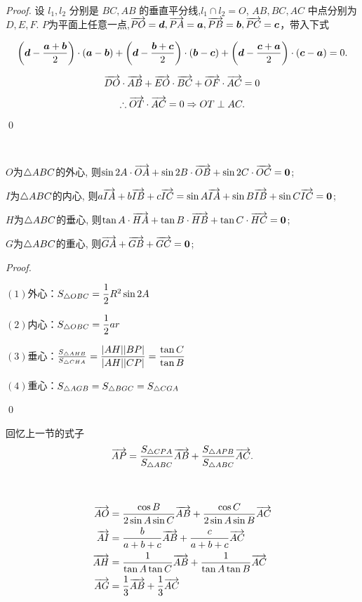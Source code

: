 \begin{proof}
    设 $l_1, l_2$ 分别是 $BC, AB$ 的垂直平分线,\(l_1\cap l_2=O\), $AB, BC, AC$ 中点分别为 $D, E, F$.
    \(P\)为平面上任意一点,\(\overrightarrow{PO}=\boldsymbol{d}, \overrightarrow{PA}=\boldsymbol{a},\overrightarrow{PB}=\boldsymbol{b},\overrightarrow{PC}=\boldsymbol{c}\)，带入下式

    \[
\left(\boldsymbol{d} - \frac{\boldsymbol{a}+\boldsymbol{b}}{2}\right) \cdot (\boldsymbol{a}-\boldsymbol{b}) + \left(\boldsymbol{d}-\frac{\boldsymbol{b}+\boldsymbol{c}}{2}\right) \cdot (\boldsymbol{b}-\boldsymbol{c}) + \left(
    \boldsymbol{d} - \frac{\boldsymbol{c}+\boldsymbol{a}}{2}\right) \cdot (\boldsymbol{c}-\boldsymbol{a}) = 0.
\]

\[
\overrightarrow{DO} \cdot \overrightarrow{AB} + \overrightarrow{EO} \cdot \overrightarrow{BC} + \overrightarrow{OF} \cdot \overrightarrow{AC} = 0
\]
\[
\therefore \overrightarrow{OT} \cdot \overrightarrow{AC} = 0 \Rightarrow  OT \perp AC.
\]
\qed
\end{proof}

\begin{corollary}
    \ 

    \(O\)为\(\triangle ABC\)的外心, 则\(\sin 2A \cdot\overrightarrow{OA}+\sin 2B\cdot\overrightarrow{OB}+\sin 2C\cdot\overrightarrow{OC}=\boldsymbol{0}\);

    \(I\)为\(\triangle ABC\)的内心, 则\(a\overrightarrow{IA}+b\overrightarrow{IB}+c\overrightarrow{IC}=\sin A\overrightarrow{IA}+\sin B\overrightarrow{IB}+\sin C\overrightarrow{IC}=\boldsymbol{0}\);

    \(H\)为\(\triangle ABC\)的垂心, 则\(\tan A \cdot\overrightarrow{HA}+\tan B\cdot\overrightarrow{HB}+\tan C\cdot\overrightarrow{HC}=\boldsymbol{0}\);

    \(G\)为\(\triangle ABC\)的重心, 则\(\overrightarrow{GA}+\overrightarrow{GB}+\overrightarrow{GC}=\boldsymbol{0}\);
\end{corollary}
\begin{proof}
    \  

    \((1)\)外心：\(S_{\triangle OBC}=\dfrac{1}{2}R^2\sin 2A\)

    \((2)\)内心：\(S_{\triangle OBC}=\dfrac{1}{2}ar\)

    \((3)\)垂心：\(\frac{S_{\triangle AHB}}{S_{\triangle CHA}}=\dfrac{|AH||BP|}{|AH||CP|}=\dfrac{\tan C}{\tan B}\)

    \((4)\)重心：\(S_{\triangle AGB}=S_{\triangle BGC}=S_{\triangle CGA}\)
    
    \qed
\end{proof}
回忆上一节的式子
\[
\overrightarrow{AP} =\frac{S_{\triangle CPA}}{S_{\triangle ABC}} \overrightarrow{AB} + \frac{S_{\triangle APB}}{S_{\triangle ABC}} \overrightarrow{AC}.
\]
\begin{proposition}
    \ 

    \begin{align*}
        \overrightarrow{AO}&=\frac{\cos B}{2\sin A\sin C}\overrightarrow{AB}+\frac{\cos C}{2\sin A\sin B}\overrightarrow{AC}\\
    \overrightarrow{AI}&=\frac{b}{a+b+c}\overrightarrow{AB}+\frac{c}{a+b+c}\overrightarrow{AC}\\
    \overrightarrow{AH}&=\frac{1}{\tan A \tan C}\overrightarrow{AB}+\frac{1}{\tan A\tan B}\overrightarrow{AC}\\
    \overrightarrow{AG}&=\dfrac{1}{3}\overrightarrow{AB}+\dfrac{1}{3}\overrightarrow{AC}
    \end{align*}
    
\end{proposition}
